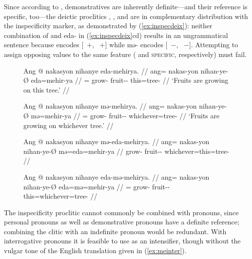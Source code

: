 Since according to \citet[152]{lyons1999}, demonstratives are inherently
definite---and their reference is specific, too---the deictic proclitics
, , and  are in
complementary distribution with the inspecificity marker, as demonstrated by
(\ref{ex:inspecdeix}): neither combination of  and 
{eda-} in (\ref{ex:inspecdeix}cd) results in an ungrammatical sentence because 
 encodes [\Def{}~$+$, \Specif{}~$+$] while 
{mə-} encodes [\Def{}~$-$, \Specif{}~$-$]. Attempting to assign
opposing values to the same feature (\Def{} and \textsc{specific},
respectively) must fail.

\begin{figure}
\pex\label{ex:inspecdeix}
\a\label{ex:inspecdeix_1}\begingl
	\gla Ang @ nakasyon nihanye eda-mehirya. //
	\glb ang= nakas-yon nihan-ye-Ø eda=mehir-ya //
	\glc \AgtT{}= grow-\TplN{} fruit-\Pl{}-\Top{} this=tree-\Loc{} //
	\glft `Fruits are growing on this tree.' //
\endgl

\a\label{ex:inspecdeix_2}\begingl
	\gla Ang @ nakasyon nihanye mə-mehirya. //
	\glb ang= nakas-yon nihan-ye-Ø mə=mehir-ya //
	\glc \AgtT{}= grow-\TplN{} fruit-\Pl{}-\Top{} whichever=tree-\Loc{} //
	\glft `Fruits are growing on whichever tree.' //
\endgl

\a\ljudge*\label{ex:inspecdeix_3}\begingl
	\gla Ang @ nakasyon nihanye mə-eda-mehirya. //
	\glb ang= nakas-yon nihan-ye-Ø mə=eda=mehir-ya //
	\glc \AgtT{} grow-\TplN{} fruit-\Pl{}-\Top{} whichever=this=tree-\Loc{} //
\endgl

\a\ljudge*\label{ex:inspecdeix_4}\begingl
	\gla Ang @ nakasyon nihanye eda-mə-mehirya. //
	\glb ang= nakas-yon nihan-ye-Ø eda=mə=mehir-ya //
	\glc \AgtT{}= grow-\TplN{} fruit-\Pl{}-\Top{} this=whichever=tree-\Loc{} //
\endgl

\xe
\end{figure}

The inspecificity proclitic  cannot commonly be combined with
pronouns, since personal pronouns as well as demonstrative pronouns have a
definite reference; combining the clitic with an indefinite pronoun would be
redundant. With interrogative pronouns it is feasible to use  as
an intensifier, though without the vulgar tone of the English translation given
in (\ref{ex:meinter}).

